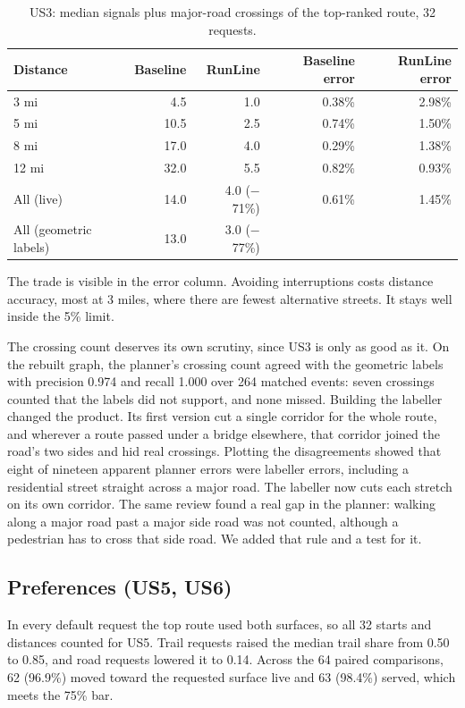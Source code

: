 \begin{table}[ht]
\centering\small
\caption{US3: median signals plus major-road crossings of the top-ranked route, 32 requests.}
\label{tab:us3}
\begin{tabular}{@{}l r r r r@{}}
\toprule
Distance & Baseline & RunLine & Baseline error & RunLine error \\
\midrule
3 mi & 4.5 & 1.0 & 0.38\% & 2.98\% \\
5 mi & 10.5 & 2.5 & 0.74\% & 1.50\% \\
8 mi & 17.0 & 4.0 & 0.29\% & 1.38\% \\
12 mi & 32.0 & 5.5 & 0.82\% & 0.93\% \\
\midrule
All (live) & 14.0 & 4.0 ($-$71\%) & 0.61\% & 1.45\% \\
All (geometric labels) & 13.0 & 3.0 ($-$77\%) & & \\
\bottomrule
\end{tabular}
\end{table}

The trade is visible in the error column. Avoiding interruptions costs
distance accuracy, most at 3 miles, where there are fewest alternative
streets. It stays well inside the 5\% limit.

The crossing count deserves its own scrutiny, since US3 is only as good as
it. On the rebuilt graph, the planner's crossing count agreed with the
geometric labels with precision 0.974 and recall 1.000 over 264 matched
events: seven crossings counted that the labels did not support, and none
missed. Building the labeller changed the product. Its first version cut a
single corridor for the whole route, and wherever a route passed under a
bridge elsewhere, that corridor joined the road's two sides and hid real
crossings. Plotting the disagreements showed that eight of nineteen apparent
planner errors were labeller errors, including a residential street straight
across a major road. The labeller now cuts each stretch on its own corridor.
The same review found a real gap in the planner: walking along a major road
past a major side road was not counted, although a pedestrian has to cross
that side road. We added that rule and a test for it.

\subsection{Preferences (US5, US6)}
In every default request the top route used both surfaces, so all 32 starts
and distances counted for US5. Trail requests raised the median trail share
from 0.50 to 0.85, and road requests lowered it to 0.14. Across the 64
paired comparisons, 62 (96.9\%) moved toward the requested surface live and
63 (98.4\%) served, which meets the 75\% bar.

